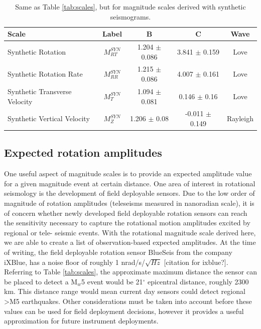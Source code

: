 \documentclass{gji}
\begin{document}
\begin{table}
\begin{minipage}{115mm}
	\begin{center}
		\begin{tabular}{ |l|c|c|c|c| } 
		        \bf{Scale} & \bf{Label} & \bf{B} & \bf{C}  & \bf{Wave}\\ \hline
        Synthetic Rotation  & $M^{SYN}_{RT}$ & 1.204 $\pm$ 0.086 & 3.841 $\pm$ 0.159  & Love \\ \hline
	Synthetic Rotation Rate & $M^{SYN}_{RR}$ & 1.215 $\pm$ 0.086 & 4.007 $\pm$ 0.161  & Love\\ \hline 
        Synthetic Transverse Velocity & $M^{SYN}_T$ & 1.094 $\pm$ 0.081 & 0.146 $\pm$ 0.16 & Love \\ \hline
        Synthetic Vertical Velocity  & $M^{SYN}_Z$ & 1.206 $\pm$ 0.08 & -0.011 $\pm$ 0.149  & Rayleigh \\ \hline
		\end{tabular}
		
    		\caption{Same as Table \ref{tab:scales}, but for magnitude scales derived with synthetic seismograms.}
		\label{tab:syn_scales}
	\end{center}
	\end{minipage}
\end{table}


\subsection{Expected rotation amplitudes}
One useful aspect of magnitude scales is to provide an expected amplitude value for a given magnitude event at certain distance. One area of interest in rotational seismology is the development of field deployable sensors. Due to the low order of magnitude of rotation amplitudes (teleseisms measured in nanoradian scale), it is of concern whether newly developed field deployable rotation sensors can reach the sensitivity necessary to capture the rotational motion amplitudes excited by regional or tele- seismic events. With the rotational magnitude scale derived here, we are able to create a list of observation-based expected amplitudes. At the time of writing, the field deployable rotation sensor BlueSeis from the company iXBlue, has a noise floor of roughly 1 nrad/s/$\sqrt{Hz}$ [citation for ixblue?]. Referring to Table \ref{tab:scales}, the approximate maximum distance the sensor can be placed to detect a M$_w$5 event would be 21$^\circ$ epicentral distance, roughly 2300 km. This distance range would mean current day sensors could detect regional >M5 earthquakes. Other considerations must be taken into account before these values can be used for field deployment decisions, however it provides a useful approximation for future instrument deployments.
\end{document}
